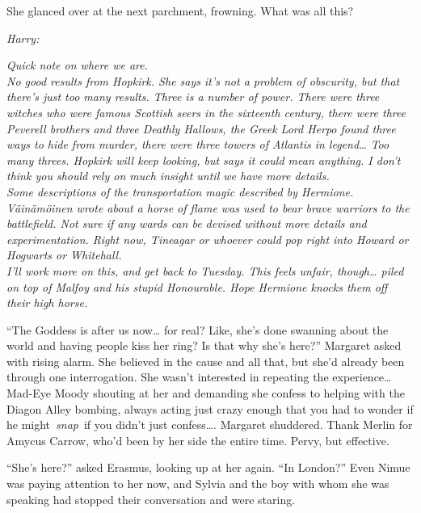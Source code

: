 She glanced over at the next parchment, frowning. What was all this?

\mybreak

\noindent\emph{Harry:}

\noindent\emph{Quick note on where we are.}\\

\emph{No good results from Hopkirk. She says it's not a problem of
obscurity, but that there's just too many results. Three is a number of
power. There were three witches who were famous Scottish seers in the
sixteenth century, there were three Peverell brothers and three Deathly
Hallows, the Greek Lord Herpo found three ways to hide from murder,
there were three towers of Atlantis in legend\ldots{} Too many threes.
Hopkirk will keep looking, but says it could mean anything. I don't
think you should rely on much insight until we have more details.}\\

\emph{Some descriptions of the transportation magic described by
Hermione. Väinämöinen wrote about a horse of flame was used to bear
brave warriors to the battlefield. Not sure if any wards can be devised
without more details and experimentation. Right now, Tineagar or whoever
could pop right into Howard or Hogwarts or Whitehall.}\\

\emph{I'll work more on this, and get back to Tuesday. This feels
unfair, though\ldots{} piled on top of Malfoy and his stupid Honourable.
Hope Hermione knocks them off their high horse.}


\mybreak

``The Goddess is after us now\ldots{} for real? Like, she's done
swanning about the world and having people kiss her ring? Is that why
she's here?'' Margaret asked with rising alarm. She believed in the
cause and all that, but she'd already been through one interrogation.
She wasn't interested in repeating the experience\ldots{} Mad-Eye Moody
shouting at her and demanding she confess to helping with the Diagon
Alley bombing, always acting just crazy enough that you had to wonder if
he might~\emph{snap}~if you didn't just confess\ldots. Margaret
shuddered. Thank Merlin for Amycus Carrow, who'd been by her side the
entire time. Pervy, but effective.

``She's here?'' asked Erasmus, looking up at her again. ``In London?''
Even Nimue was paying attention to her now, and Sylvia and the boy with
whom she was speaking had stopped their conversation and were staring.

